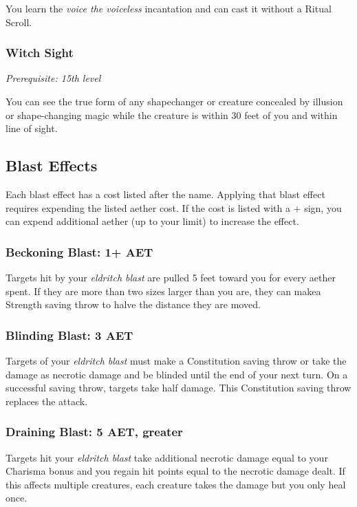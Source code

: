 You learn the \textit{voice the voiceless} incantation and can cast it without a Ritual Scroll.

\subsubsection{Witch Sight}

\textit{Prerequisite: 15th level}

You can see the true form of any shapechanger or creature concealed by illusion or shape-changing magic while the creature is within 30 feet of you and within line of sight.

\subsection{Blast Effects}

Each blast effect has a cost listed after the name. Applying that blast effect requires expending the listed aether cost. If the cost is listed with a + sign, you can expend additional aether (up to your limit) to increase the effect.

\subsubsection{Beckoning Blast: 1+ AET}
Targets hit by your \textit{eldritch blast} are pulled 5 feet toward you for every aether spent. If they are more than two sizes larger than you are, they can makea Strength saving throw to halve the distance they are moved.

\subsubsection{Blinding Blast: 3 AET}
Targets of your \textit{eldritch blast} must make a Constitution saving throw or take the damage as necrotic damage and be blinded until the end of your next turn. On a successful saving throw, targets take half damage. This Constitution saving throw replaces the attack.

\subsubsection{Draining Blast: 5 AET, greater}
Targets hit your \textit{eldritch blast} take additional necrotic damage equal to your Charisma bonus and you regain hit points equal to the necrotic damage dealt. If this affects multiple creatures, each creature takes the damage but you only heal once.

